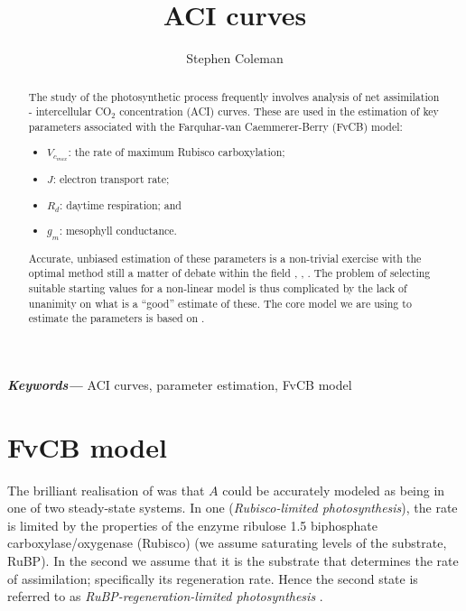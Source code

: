 \documentclass[11pt]{article} %
\title{ACI curves}
\author{Stephen Coleman}
\providecommand{\keywords}[1]
{
  \small	
  \textbf{\textit{Keywords---}} #1
}
\begin{document}
 \pgfplotsset{compat=1.16}
\maketitle

\begin{abstract}
The study of the photosynthetic process frequently involves analysis of net assimilation - intercellular CO$_2$ concentration (ACI) curves. These are used in the estimation of key parameters associated with the Farquhar-van Caemmerer-Berry (FvCB) \cite{Farquharbiochemicalmodelphotosynthetic1980} model:
\begin{itemize}
 \item $V_{c_{max}}$: the rate of maximum Rubisco carboxylation;
 \item $J$: electron transport rate;
 \item $R_d$: daytime respiration; and
 \item $g_m$: mesophyll conductance.
\end{itemize}
Accurate, unbiased estimation of these parameters is a non-trivial exercise with the optimal method still a matter of debate within the field \cite{Moualeu-Nganguenewmethodestimate2017}, \cite{YinTheoreticalreconsiderationswhen2009}, \cite{QianEstimationphotosynthesisparameters2012}. The problem of selecting suitable starting values for a non-linear model is thus complicated by the lack of unanimity on what is a ``good'' estimate of these. The core model we are using to estimate the parameters is based on \citet{SharkeyFittingphotosyntheticcarbon2007}. %
\end{abstract}

\keywords{ACI curves, parameter estimation, FvCB model}



\section{FvCB model}
The brilliant realisation of \citet{Farquharbiochemicalmodelphotosynthetic1980} was that $A$ could be accurately modeled as being in one of two steady-state systems. In one (\emph{Rubisco-limited photosynthesis}), the rate is limited by the properties of the enzyme ribulose 1.5 biphosphate carboxylase/oxygenase (Rubisco) (we assume saturating levels of the substrate, RuBP). In the second we assume that it is the substrate that determines the rate of assimilation; specifically its regeneration rate. Hence the second state is referred to as \emph{RuBP-regeneration-limited photosynthesis} \cite{SharkeyFittingphotosyntheticcarbon2007}.
\end{document}
